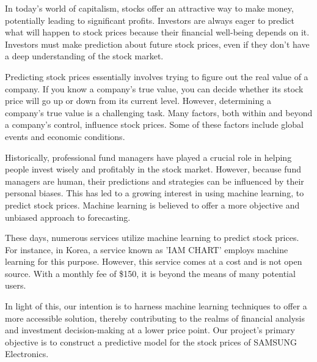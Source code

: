 In today's world of capitalism, stocks offer an attractive way to make money, potentially leading to significant profits. 
Investors are always eager to predict what will happen to stock prices because their financial well-being depends on it. 
Investors must make prediction about future stock prices, even if they don't have a deep understanding of the stock market.

Predicting stock prices essentially involves trying to figure out the real value of a company. 
If you know a company's true value, you can decide whether its stock price will go up or down from its current level. 
However, determining a company's true value is a challenging task. 
Many factors, both within and beyond a company's control, influence stock prices. 
Some of these factors include global events and economic conditions. 

Historically, professional fund managers have played a crucial role in helping people invest wisely and profitably in the stock market. 
However, because fund managers are human, their predictions and strategies can be influenced by their personal biases. 
This has led to a growing interest in using machine learning, to predict stock prices. 
Machine learning is believed to offer a more objective and unbiased approach to forecasting.

These days, numerous services utilize machine learning to predict stock prices. 
For instance, in Korea, a service known as 'IAM CHART' employs machine learning for this purpose. 
However, this service comes at a cost and is not open source. 
With a monthly fee of \$150, it is beyond the means of many potential users.

In light of this, our intention is to harness machine learning techniques to offer a more accessible solution, 
thereby contributing to the realms of financial analysis and investment decision-making at a lower price point. 
Our project's primary objective is to construct a predictive model for the stock prices of SAMSUNG Electronics.

